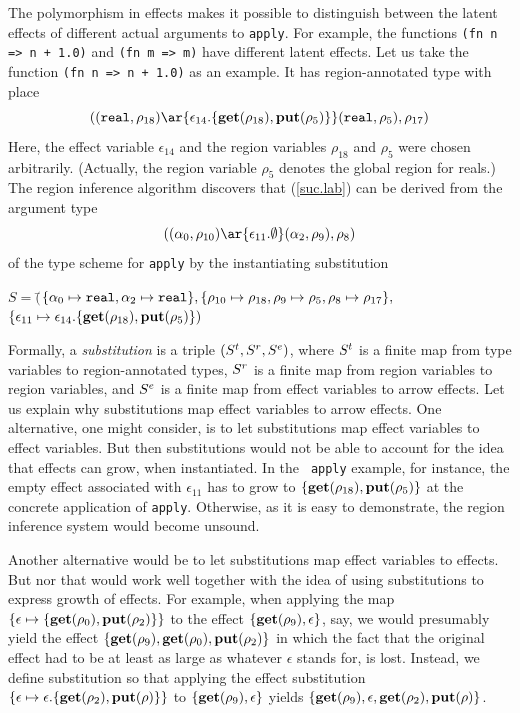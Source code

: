 \documentclass[12pt]{book}
\begin{document}
The polymorphism in effects makes it possible to distinguish between
the latent effects of different actual arguments to {\tt apply}. For
example, the functions {\tt (fn n => n + 1.0)} and {\tt (fn m => m)}
have different latent effects. Let us take the function {\tt (fn n =>
  n + 1.0)} as an example. It has region-annotated type with place
\begin{equation}
\label{suc.lab}
((\boxml{real},\rho_{18})\ar{\epsilon_{14}.\{\Get(\rho_{18}),\Put(\rho_5)\}}(\boxml{real}, \rho_5), \rho_{17})
\end{equation}
Here, the effect variable $\epsilon_{14}$ and the region variables
$\rho_{18}$ and $\rho_5$ were chosen arbitrarily. (Actually, the
region variable $\rho_5$ denotes the global region for reals.) The
region inference algorithm discovers that (\ref{suc.lab}) can be
derived from the argument type
$$((\alpha_0,\rho_{10})\ar{\epsilon_{11}.\emptyset}(\alpha_2,\rho_9),\rho_8)$$
of the type scheme for {\tt apply} by the instantiating substitution
\begin{tabbing}
$S =($\=$\{\alpha_0\mapsto\hbox{\tt real},\alpha_2\mapsto\hbox{\tt real}\},\{
       \rho_{10}\mapsto\rho_{18},\rho_9\mapsto\rho_5,\rho_8\mapsto\rho_{17}\},$\\
\>$\{
       \epsilon_{11}\mapsto\epsilon_{14}.\{\mathop{\bf get}\nolimits(\rho_{18}),\mathop{\bf put}\nolimits(\rho_5)\})$
\end{tabbing}
Formally, a 
%
{\em substitution\/} is a triple $(S^t,S^r,S^e)$, where $S^t$ is a
finite map from type variables to region-annotated types, $S^r$ is a
finite map from region variables to region variables, and $S^e$ is a
finite map from effect variables to arrow effects.  Let us explain why
substitutions map effect variables to arrow effects.  One alternative,
one might consider, is to let substitutions map effect variables to
effect variables. But then substitutions would not be able to account
for the idea that effects can grow, when instantiated. In the {\tt
  apply} example, for instance, the empty effect associated with
$\epsilon_{11}$ has to grow to $\{\mathop{\bf get}\nolimits(\rho_{18}),\mathop{\bf put}\nolimits(\rho_5)\}$ at
the concrete application of {\tt apply}. Otherwise, as it is easy to
demonstrate, the region inference system would become unsound.

Another alternative would be to let substitutions map effect variables
to effects. But nor that would work well together with the idea of
using substitutions to express growth of effects. For example,
when applying the map $\{\epsilon\mapsto\{\mathop{\bf get}\nolimits(\rho_0),\mathop{\bf put}\nolimits(\rho_2)\}\}$ to
the effect $\{\mathop{\bf get}\nolimits(\rho_9),\epsilon\}$, say, we would presumably yield
the effect $\{\mathop{\bf get}\nolimits(\rho_9),\mathop{\bf get}\nolimits(\rho_0),\mathop{\bf put}\nolimits(\rho_2)\}$ in which the
fact that the original effect had to be at least as large as whatever
$\epsilon$ stands for, is lost.  Instead, we define substitution so
that applying the effect substitution
$\{\epsilon\mapsto\epsilon.\{\mathop{\bf get}\nolimits(\rho_2),\mathop{\bf put}\nolimits(\rho)\}\}$ to
$\{\mathop{\bf get}\nolimits(\rho_9),\epsilon\}$ yields
$\{\mathop{\bf get}\nolimits(\rho_9),\epsilon,\mathop{\bf get}\nolimits(\rho_2),\mathop{\bf put}\nolimits(\rho)\}$.
\end{document}
